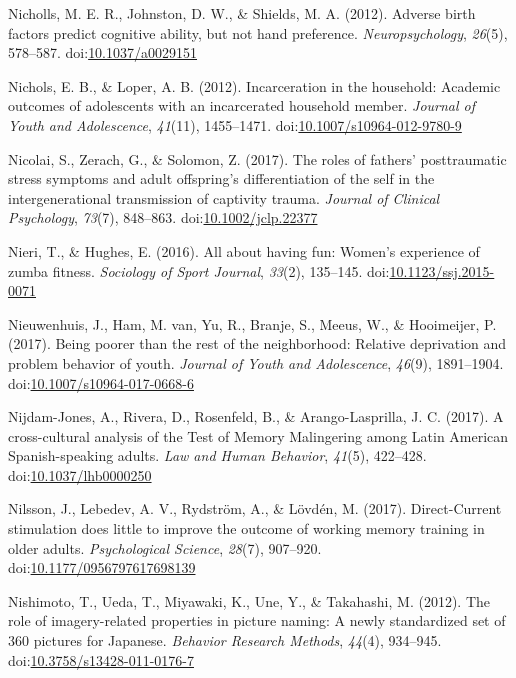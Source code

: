 \documentclass[english,man]{apa6}
\theoremstyle{definition}
\theoremstyle{definition}
\theoremstyle{definition}
\theoremstyle{remark}
\begin{document}
\hypertarget{ref-Nicholls2012}{}
Nicholls, M. E. R., Johnston, D. W., \& Shields, M. A. (2012). Adverse
birth factors predict cognitive ability, but not hand preference.
\emph{Neuropsychology}, \emph{26}(5), 578--587.
doi:\href{https://doi.org/10.1037/a0029151}{10.1037/a0029151}

\hypertarget{ref-Nichols2012}{}
Nichols, E. B., \& Loper, A. B. (2012). Incarceration in the household:
Academic outcomes of adolescents with an incarcerated household member.
\emph{Journal of Youth and Adolescence}, \emph{41}(11), 1455--1471.
doi:\href{https://doi.org/10.1007/s10964-012-9780-9}{10.1007/s10964-012-9780-9}

\hypertarget{ref-Nicolai2017}{}
Nicolai, S., Zerach, G., \& Solomon, Z. (2017). The roles of fathers'
posttraumatic stress symptoms and adult offspring's differentiation of
the self in the intergenerational transmission of captivity trauma.
\emph{Journal of Clinical Psychology}, \emph{73}(7), 848--863.
doi:\href{https://doi.org/10.1002/jclp.22377}{10.1002/jclp.22377}

\hypertarget{ref-Nieri2016}{}
Nieri, T., \& Hughes, E. (2016). All about having fun: Women's
experience of zumba fitness. \emph{Sociology of Sport Journal},
\emph{33}(2), 135--145.
doi:\href{https://doi.org/10.1123/ssj.2015-0071}{10.1123/ssj.2015-0071}

\hypertarget{ref-Nieuwenhuis2017}{}
Nieuwenhuis, J., Ham, M. van, Yu, R., Branje, S., Meeus, W., \&
Hooimeijer, P. (2017). Being poorer than the rest of the neighborhood:
Relative deprivation and problem behavior of youth. \emph{Journal of
Youth and Adolescence}, \emph{46}(9), 1891--1904.
doi:\href{https://doi.org/10.1007/s10964-017-0668-6}{10.1007/s10964-017-0668-6}

\hypertarget{ref-Nijdam-Jones2017}{}
Nijdam-Jones, A., Rivera, D., Rosenfeld, B., \& Arango-Lasprilla, J. C.
(2017). A cross-cultural analysis of the Test of Memory Malingering
among Latin American Spanish-speaking adults. \emph{Law and Human
Behavior}, \emph{41}(5), 422--428.
doi:\href{https://doi.org/10.1037/lhb0000250}{10.1037/lhb0000250}

\hypertarget{ref-Nilsson2017}{}
Nilsson, J., Lebedev, A. V., Rydström, A., \& Lövdén, M. (2017).
Direct-Current stimulation does little to improve the outcome of working
memory training in older adults. \emph{Psychological Science},
\emph{28}(7), 907--920.
doi:\href{https://doi.org/10.1177/0956797617698139}{10.1177/0956797617698139}

\hypertarget{ref-Nishimoto2012}{}
Nishimoto, T., Ueda, T., Miyawaki, K., Une, Y., \& Takahashi, M. (2012).
The role of imagery-related properties in picture naming: A newly
standardized set of 360 pictures for Japanese. \emph{Behavior Research
Methods}, \emph{44}(4), 934--945.
doi:\href{https://doi.org/10.3758/s13428-011-0176-7}{10.3758/s13428-011-0176-7}
\end{document}
